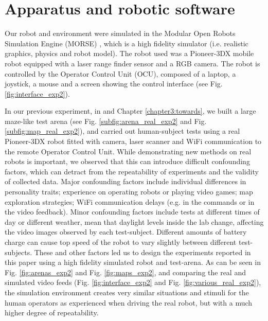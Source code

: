 \documentclass[a4paper,12pt,oneside,openright]{bhamthesis}
\begin{document}
\section{Apparatus and robotic software}
Our robot and environment were simulated in the Modular Open Robots Simulation Engine (MORSE) \citep{Echeverria2011}, which is a high fidelity simulator (i.e. realistic graphics, physics and robot model). The robot used was a Pioneer-3DX mobile robot equipped with a laser range finder sensor and a RGB camera. The robot is controlled by the Operator Control Unit (OCU), composed of a laptop, a joystick, a mouse and a screen showing the control interface (see Fig. \ref{fig:interface_exp2}).

In our previous experiment, in \citep{Chiou2015} and Chapter \ref{chapter3:towards}, we built a large maze-like test arena (see Fig. \ref{subfig:arena_real_exp2} and Fig. \ref{subfig:map_real_exp2}), and carried out human-subject tests using a real Pioneer-3DX robot fitted with camera, laser scanner and WiFi communication to the remote Operator Control Unit. While demonstrating new methods on real robots is important, we observed that this can introduce difficult confounding factors, which can detract from the repeatability of experiments and the validity of collected data. Major confounding factors include individual differences in personality traits; experience on operating robots or playing video games; map exploration strategies; WiFi communication delays (e.g. in the commands or in the video feedback). Minor confounding factors include tests at different times of day or different weather, mean that daylight levels inside the lab change, affecting the video images observed by each test-subject. Different amounts of battery charge can cause top speed of the robot to vary slightly between different test-subjects. These and other factors led us to design the experiments reported in this paper using a high fidelity simulated robot and test-arena. As can be seen in Fig. \ref{fig:arenas_exp2} and Fig. \ref{fig:maps_exp2}, and comparing the real and simulated video feeds (Fig. \ref{fig:interface_exp2} and Fig. \ref{fig:various_real_exp2}), the simulation environment creates very similar situations and stimuli for the human operators as experienced when driving the real robot, but with a much higher degree of repeatability.
\end{document}
